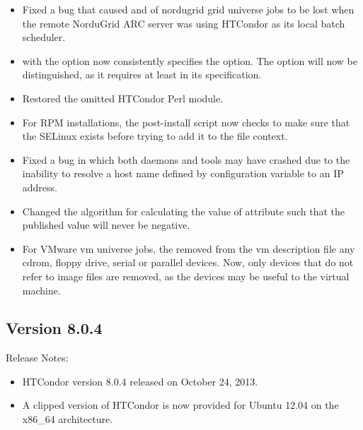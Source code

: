 \begin{itemize}
\item Fixed a bug that caused  and  of
nordugrid grid universe jobs to be lost when the remote 
NorduGrid ARC server was using HTCondor as its local batch scheduler.

\item {} with the  option now consistently 
specifies the  option. 
The  option will now be distinguished, as it requires
at least  in its specification.

\item Restored the omitted HTCondor Perl module.

\item For RPM installations, the post-install script now
checks to make sure that the
SELinux  exists before trying to
add it to the  file context.

\item Fixed a bug in which both daemons and tools may have crashed due to
the inability to resolve a host name defined by 
configuration variable  to an IP address.

\item Changed the algorithm for calculating the value of attribute
 such
that the published value will never be negative.

\item For VMware vm universe jobs,
the  removed from the vm description file any cdrom, 
floppy drive, serial or parallel devices.
Now, only devices that do not refer to image files are removed,
as the devices may be useful to the virtual machine.

\end{itemize}


\subsection*{\label{sec:New-8-0-4}Version 8.0.4}

\noindent Release Notes:

\begin{itemize}

\item HTCondor version 8.0.4 released on October 24, 2013.

\item A clipped version of HTCondor is now provided for Ubuntu 12.04 
on the x86\_64 architecture.

\end{itemize}


